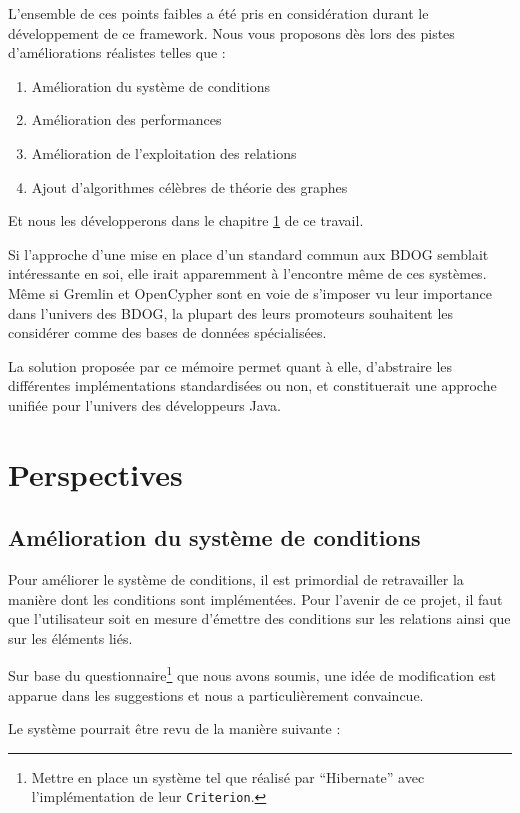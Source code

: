 \documentclass[a4paper,fleqn,12pt,oneside]{report}
\begin{document}
L'ensemble de ces points faibles a été pris en considération durant le développement de ce framework. Nous vous proposons dès lors des pistes d'améliorations réalistes telles que : 
\begin{enumerate}
\item Amélioration du système de conditions
\item Amélioration des performances
\item Amélioration de l'exploitation des relations
\item Ajout d'algorithmes célèbres de théorie des graphes
\end{enumerate}
 
Et nous les développerons dans le chapitre \ref{perspectives} de ce travail.

Si l'approche d'une mise en place d'un standard commun aux BDOG semblait intéressante en soi, elle irait apparemment à l'encontre même de ces systèmes. Même si Gremlin et OpenCypher sont en voie de s'imposer vu leur importance dans l'univers des BDOG, la plupart des leurs promoteurs souhaitent les considérer comme des bases de données spécialisées.

La solution proposée par ce mémoire permet quant à elle, d'abstraire les différentes implémentations standardisées ou non, et constituerait une approche unifiée pour l'univers des développeurs Java.

\chapter{Perspectives}
\label{perspectives}
\section{Amélioration du système de conditions}

Pour améliorer le système de conditions, il est primordial de retravailler la manière dont les conditions sont implémentées. Pour l'avenir de ce projet, il faut que l'utilisateur soit en mesure d'émettre des conditions sur les relations ainsi que sur les éléments liés.

Sur base du questionnaire\footnote{Mettre en place un système tel que réalisé par \enquote{Hibernate} avec l'implémentation de leur \texttt{Criterion}.} que nous avons soumis, une idée de modification est apparue dans les suggestions et nous a particulièrement convaincue. 

Le système pourrait être revu de la manière suivante : 
\end{document}
